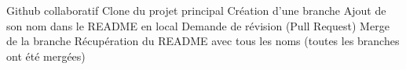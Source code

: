 
Github collaboratif 
Clone du projet principal 
Création d’une branche 
Ajout de son nom dans le README en local
Demande de révision (Pull Request)
Merge de la branche 
Récupération du README avec tous les noms (toutes les branches ont été mergées)
